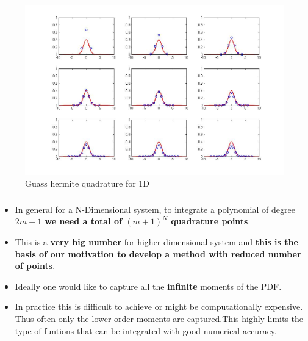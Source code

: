 \documentclass[11pt]{beamer}
\begin{document}
\begin{frame}
\begin{figure}[h]
	\centering
		\includegraphics[width=1\textwidth]{contvsdisc.jpg}
	\caption{Guass hermite quadrature for 1D}
\end{figure}
\end{frame}
\begin{frame}
\frametitle{}
\begin{itemize}
\item In general for a N-Dimensional system, to integrate a polynomial of degree{\bf  $2m+1$ we need a total of $(m+1)^N$ quadrature points}. 
\item This is a {\bf very big number} for higher dimensional system and {\bf this is the basis of {\bf our motivation} to develop a method with reduced number of points}. 
\item Ideally one would like to capture all the {\bf infinite} moments of the PDF.
\item In practice this is difficult to achieve or might be computationally expensive. Thus often only the lower order moments are captured.This highly limits the type of funtions that can be integrated with good numerical accuracy.
\end{itemize}
\end{frame}
\end{document}
